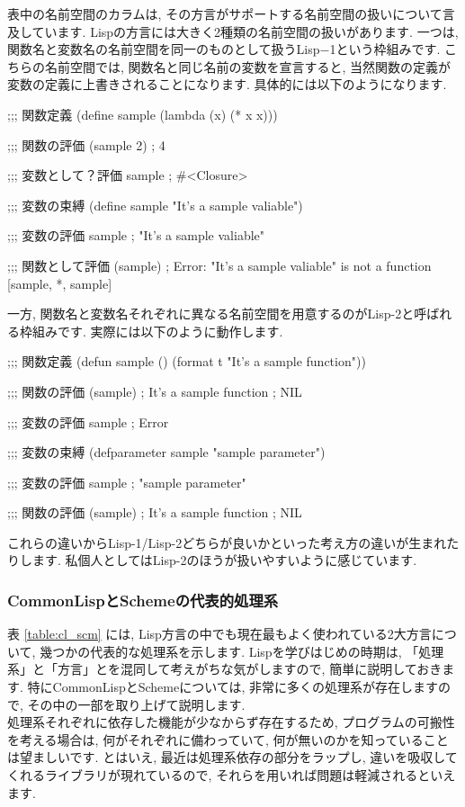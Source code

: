 \documentclass[mingoth,a4paper]{jsarticle}
\begin{document}
表中の名前空間のカラムは, その方言がサポートする名前空間の扱いについて言及しています. Lispの方言には大きく2種類の名前空間の扱いがあります. 一つは, 関数名と変数名の名前空間を同一のものとして扱うLisp−1という枠組みです. こちらの名前空間では, 関数名と同じ名前の変数を宣言すると, 当然関数の定義が変数の定義に上書きされることになります. 具体的には以下のようになります. 

\begin{commandline}
;;; 関数定義
(define sample
	(lambda (x) (* x x)))

;;; 関数の評価
(sample 2)         ; 4

;;; 変数として？評価
sample             ; #<Closure>

;;; 変数の束縛
(define sample "It's a sample valiable")

;;; 変数の評価
sample             ; "It's a sample valiable"

;;; 関数として評価
(sample)           ; Error: "It's a sample valiable" is not a function [sample, *, sample]
\end{commandline}

一方, 関数名と変数名それぞれに異なる名前空間を用意するのがLisp-2と呼ばれる枠組みです. 実際には以下のように動作します. 

\begin{commandline}
;;; 関数定義 
(defun sample ()
	(format t "It's a sample function"))

;;; 関数の評価
(sample) ; It's a sample function
	     ; NIL

;;; 変数の評価
sample   ; Error

;;; 変数の束縛
(defparameter sample "sample parameter")

;;; 変数の評価
sample   ; "sample parameter"

;;; 関数の評価
(sample) ; It's a sample function
	     ; NIL
\end{commandline}

これらの違いからLisp-1/Lisp-2どちらが良いかといった考え方の違いが生まれたりします. 
私個人としてはLisp-2のほうが扱いやすいように感じています. 


\subsubsection{CommonLispとSchemeの代表的処理系}

表 \ref{table:cl_scm} には, Lisp方言の中でも現在最もよく使われている2大方言について, 幾つかの代表的な処理系を示します. Lispを学びはじめの時期は, 「処理系」と「方言」とを混同して考えがちな気がしますので, 簡単に説明しておきます. 
特にCommonLispとSchemeについては, 非常に多くの処理系が存在しますので, その中の一部を取り上げて説明します.\vspace{1em}\\ 
処理系それぞれに依存した機能が少なからず存在するため, プログラムの可搬性を考える場合は, 何がそれぞれに備わっていて, 何が無いのかを知っていることは望ましいです. とはいえ, 最近は処理系依存の部分をラップし, 違いを吸収してくれるライブラリが現れているので, それらを用いれば問題は軽減されるといえます. 
\end{document}
